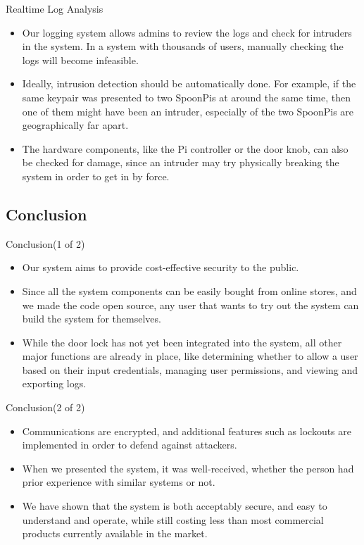 \begin{frame}{Realtime Log Analysis}
\begin{itemize}
    \item<1-> Our logging system allows admins to review the logs and check for intruders in the system. In a system with thousands of users, manually checking the logs will become infeasible.
    \item<2-> Ideally, intrusion detection should be automatically done. For example, if the same keypair was presented to two SpoonPis at around the same time, then one of them might have been an intruder, especially of the two SpoonPis are geographically far apart.
    \item<3-> The hardware components, like the Pi controller or the door knob, can also be checked for damage, since an intruder may try physically breaking the system in order to get in by force.
\end{itemize}
\end{frame}

\subsection{Conclusion}
\begin{frame}{Conclusion(1 of 2)}
\begin{itemize}
    \item<1-> Our system aims to provide cost-effective security to the public.
    \item<2-> Since all the system components can be easily bought from online stores, and we made the code open source, any user that wants to try out the system can build the system for themselves.
    \item<3-> While the door lock has not yet been integrated into the system, all other major functions are already in place, like determining whether to allow a user based on their input credentials, managing user permissions, and viewing and exporting logs.
\end{itemize}
\end{frame}

\begin{frame}{Conclusion(2 of 2)}
\begin{itemize}
    \item<1-> Communications are encrypted, and additional features such as lockouts are implemented in order to defend against attackers.
    \item<2-> When we presented the system, it was well-received, whether the person had prior experience with similar systems or not.
    \item<3-> We have shown that the system is both acceptably secure, and easy to understand and operate, while still costing less than most commercial products currently available in the market.
\end{itemize}
\end{frame}